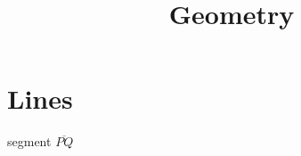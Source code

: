 \documentclass{article}
\title{Geometry}
\begin{document}
\maketitle

\section{Lines}
segment $\overline{PQ}$
\end{document}
